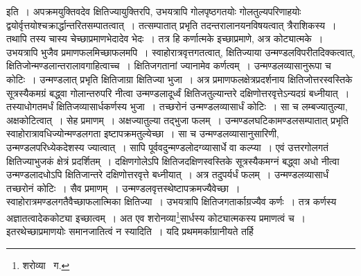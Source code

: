 \documentclass[11pt, openany]{book}
\begin{document}
\indent इति~। अपक्रमयुक्तिवदेव क्षितिज्यायुक्तिरपि, उभयत्रापि गोलपृष्ठगतयोः गोलतुल्यपरिणाहयोः द्वयोर्वृत्तयोश्चक्रार्द्धान्तरितसम्पातत्वात्~। 
तत्सम्पातात् प्रभृति तदन्तरालानयनविषयत्वात् त्रैराशिकस्य~। तथापि तस्य चास्य चेच्छाप्रमाणभेदादेव भेदः~। तत्र हि कर्णात्मके इच्छाप्रमाणे,
अत्र कोट्यात्मके~। उभयत्रापि भुजैव प्रमाणफलमिच्छाफलमपि~। स्वाहोरात्रवृत्तगतत्वात्, क्षितिज्याया उन्मण्डलविपरीतदिक्कत्वात्,
क्षितिजोन्मण्डलान्तरालावगाहित्वाच्च~। क्षितिजगतानां ज्यानामेव कर्णत्वम्~। उन्मण्डलव्यासानुरूपा च कोटिः~। उन्मण्डलात् प्रभृति क्षितिजाग्रा
क्षितिज्या भुजा~। अत्र प्रमाणफलक्षेत्रप्रदर्शनाय क्षितिजोत्तरस्वस्तिके सूत्रस्यैकमग्रं बद्ध्वा गोलान्तरुपरि नीत्वा उन्मण्डलादूर्ध्वं
क्षितिजतुल्यान्तरे दक्षिणोत्तरवृत्तेऽन्यदग्रं बध्नीयात्~। तस्याधोगतमर्धं क्षितिजव्यासार्धकर्णस्य भुजा~। तच्छरोनं उन्मण्डलव्यासार्धं कोटिः~। सा च लम्बज्यातुल्या, अक्षकोटित्वात्~। सेह प्रमाणम्~। अक्षज्यातुल्या तद्भुजा फलम्~। उन्मण्डलघटिकामण्डलसम्पातात् प्रभृति स्वाहोरात्रावधिज्योन्मण्डलगता इष्टापक्रमतुल्येच्छा~। सा च उन्मण्डलव्यासानुसारिणी, उन्मण्डलपरिध्येकदेशस्य ज्यात्वात्~। सापि पूर्ववदुन्मण्डलोदग्व्यासार्धे वा कल्प्या~। एवं उत्तरगोलगतं क्षितिज्याभुजकं क्षेत्रं प्रदर्शितम्~। दक्षिणगोलेऽपि क्षितिजदक्षिणस्वस्तिके सूत्रस्यैकमग्नं बद्ध्वा अधो नीत्वा उन्मण्डलादधोऽपि क्षितिजान्तरे दक्षिणोत्तरवृत्ते बध्नीयात्~। अत्र तदुपर्यर्धं फलम्~। उन्मण्डलव्यासार्धं तच्छरोनं कोटिः~। सैव प्रमाणम्~। उन्मण्डलवृत्तस्थेष्टापक्रमज्यैवेच्छा~। स्वाहोरात्रमण्डलगतैवैच्छाफलात्मिका क्षितिज्या~। उभयत्रापि 
क्षितिजगतार्काग्रज्यैव कर्णः~। तत्र कर्णस्य अज्ञातत्वादेककोट्या इच्छात्वम्~। अत एव शरोनव्या\renewcommand{\thefootnote}{१}\footnote{शरोव्या \textendash\ ग.}सार्धस्य कोट्यात्मकस्य प्रमाणत्वं च~। इतरथेच्छाप्रमाणयोः समानजातित्वं न स्यादिति~। यदि प्रथममर्काग्रानीयते तर्हि 

\newpage
\end{document}
